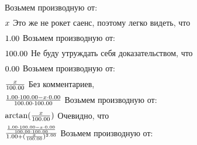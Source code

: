 Возьмем производную от:
\begin{gather}
\end{gather}
\begin{math}
x \\
\end{math}
Это же не рокет саенс, поэтому легко видеть, что
\begin{gather}
\end{gather}
\begin{math}
1.00 \\
\end{math}
Возьмем производную от:
\begin{gather}
\end{gather}
\begin{math}
100.00 \\
\end{math}
Не буду утруждать себя доказательством, что
\begin{gather}
\end{gather}
\begin{math}
0.00 \\
\end{math}
Возьмем производную от:
\begin{gather}
\end{gather}
\begin{math}
\frac {x }{100.00 }\\
\end{math}
Без комментариев, 
\begin{gather}
\end{gather}
\begin{math}
\frac {1.00 \cdot 100.00 - x \cdot 0.00 }{100.00 \cdot 100.00 }\\
\end{math}
Возьмем производную от:
\begin{gather}
\end{gather}
\begin{math}
\arctan (\frac {x }{100.00 })\\
\end{math}
Очевидно, что
\begin{gather}
\end{gather}
\begin{math}
\frac {\frac {1.00 \cdot 100.00 - x \cdot 0.00 }{100.00 \cdot 100.00 }}{1.00 + (\frac {x }{100.00 })^ {2.00 }}\\
\end{math}
Возьмем производную от:
\begin{gather}
\end{gather}
